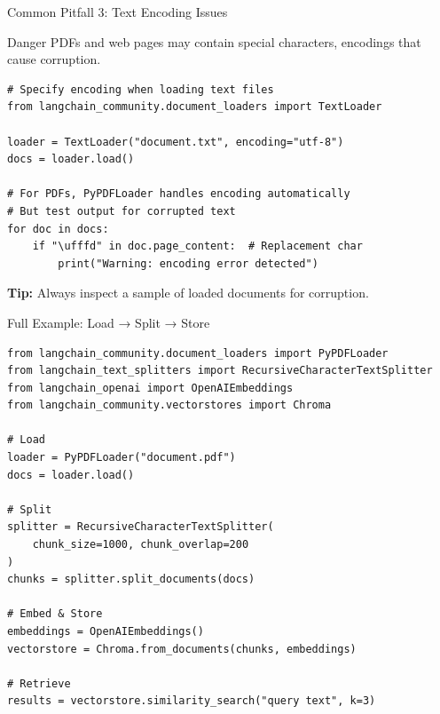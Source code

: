 \documentclass[aspectratio=169,11pt]{beamer}
\begin{document}
\begin{frame}[fragile]{Common Pitfall 3: Text Encoding Issues}
  \begin{warningbox}{Danger}
    PDFs and web pages may contain special characters, encodings that cause corruption.
  \end{warningbox}

  \vspace{0.5cm}
  \begin{lstlisting}
# Specify encoding when loading text files
from langchain_community.document_loaders import TextLoader

loader = TextLoader("document.txt", encoding="utf-8")
docs = loader.load()

# For PDFs, PyPDFLoader handles encoding automatically
# But test output for corrupted text
for doc in docs:
    if "\ufffd" in doc.page_content:  # Replacement char
        print("Warning: encoding error detected")
  \end{lstlisting}

  \vspace{0.5cm}
  \textbf{Tip:} Always inspect a sample of loaded documents for corruption.
\end{frame}

\begin{frame}[fragile]{Full Example: Load → Split → Store}
  \small
  \begin{lstlisting}
from langchain_community.document_loaders import PyPDFLoader
from langchain_text_splitters import RecursiveCharacterTextSplitter
from langchain_openai import OpenAIEmbeddings
from langchain_community.vectorstores import Chroma

# Load
loader = PyPDFLoader("document.pdf")
docs = loader.load()

# Split
splitter = RecursiveCharacterTextSplitter(
    chunk_size=1000, chunk_overlap=200
)
chunks = splitter.split_documents(docs)

# Embed & Store
embeddings = OpenAIEmbeddings()
vectorstore = Chroma.from_documents(chunks, embeddings)

# Retrieve
results = vectorstore.similarity_search("query text", k=3)
  \end{lstlisting}
\end{frame}
\end{document}
